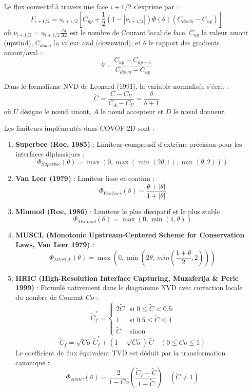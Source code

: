 \documentclass[
  french,
]{article}
\begin{document}
Le flux convectif à travers une face \(i+1/2\) s'exprime par :
\[F_{i+1/2} = u_{i+1/2} \left[ C_{up} + \frac{1}{2} (1 - |\nu_{i+1/2}|) \Phi(\theta) (C_{down} - C_{up}) \right]\]
où \(\nu_{i+1/2} = u_{i+1/2} \frac{\Delta t}{\Delta x}\) est le nombre
de Courant local de face, \(C_{up}\) la valeur amont (upwind),
\(C_{down}\) la valeur aval (downwind), et \(\theta\) le rapport des
gradients amont/aval :
\[\theta = \frac{C_{up} - C_{up-1}}{C_{down} - C_{up}}\]

Dans le formalisme NVD de Leonard (1991), la variable normalisée s'écrit
: \[\tilde{C} = \frac{C - C_U}{C_A - C_U} = \frac{\theta}{\theta + 1}\]
où \(U\) désigne le nœud amont, \(A\) le nœud accepteur et \(D\) le nœud
donneur.

Les limiteurs implémentés dans COVOF 2D sont :

\begin{enumerate}
\def\labelenumi{\arabic{enumi}.}
\item
  \textbf{Superbee (Roe, 1985)} : Limiteur compressif d'extrême
  précision pour les interfaces diphasiques :
  \[\Phi_{Superbee}(\theta) = \max \left( 0, \max(\min(2\theta, 1), \min(\theta, 2)) \right)\]
\item
  \textbf{Van Leer (1979)} : Limiteur lisse et continu :
  \[\Phi_{VanLeer}(\theta) = \frac{\theta + |\theta|}{1 + |\theta|}\]
\item
  \textbf{Minmod (Roe, 1986)} : Limiteur le plus dissipatif et le plus
  stable : \[\Phi_{Minmod}(\theta) = \max(0, \min(1, \theta))\]
\item
  \textbf{MUSCL (Monotonic Upstream-Centered Scheme for Conservation
  Laws, Van Leer 1979)} :
  \[\Phi_{MUSCL}(\theta) = \max \left( 0, \min \left( 2\theta, \ min \left( \frac{1 + \theta}{2}, 2 \right) \right) \right)\]
\item
  \textbf{HRIC (High-Resolution Interface Capturing, Muzaferija \& Peric
  1999)} : Formulé nativement dans le diagramme NVD avec correction
  locale du nombre de Courant \(Co\) :
  \[\tilde{C}_f^* = \begin{cases} 2 \tilde{C} & \text{si } 0 \le \tilde{C} < 0.5 \\ 1 & \text{si } 0.5 \le \tilde{C} \le 1 \\ \tilde{C} & \text{sinon} \end{cases}\]
  \[\tilde{C}_f = \sqrt{Co} \, \tilde{C}_f^* + (1 - \sqrt{Co}) \, \tilde{C} \quad (0 \le Co \le 1)\]
  Le coefficient de flux équivalent TVD est déduit par la transformation
  canonique :
  \[\Phi_{HRIC}(\theta) = \frac{2}{1 - Co} \left( \frac{\tilde{C}_f - \tilde{C}}{1 - \tilde{C}} \right) \quad (\tilde{C} \neq 1)\]
\end{enumerate}
\end{document}

